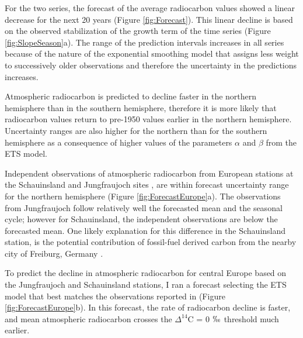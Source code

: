 \documentclass[a4paper, 11pt]{article}
\begin{document}
For the two series, the forecast of the average radiocarbon values showed a linear decrease for the next 20 years (Figure \ref{fig:Forecast}). This linear decline is based on the observed stabilization of the growth term of the time series (Figure \ref{fig:SlopeSeason}a). The range of the prediction intervals increases in all series because of the nature of the exponential smoothing model that assigns less weight to successively older observations and therefore the uncertainty in the predictions increases. 

Atmospheric radiocarbon is predicted to decline faster in the northern hemisphere than in the southern hemisphere, therefore it is more likely that radiocarbon values return to pre-1950 values earlier in the northern hemisphere. Uncertainty ranges are also higher for the northern than for the southern hemisphere as a consequence of higher values of the parameters $\alpha$ and $\beta$ from the ETS model.

Independent observations of atmospheric radiocarbon from European stations at the Schauinsland and Jungfraujoch sites \citep{Levin2013Tellus}, are within forecast uncertainty range for the northern hemisphere (Figure \ref{fig:ForecastEurope}a). The observations from Jungfraujoch follow relatively well the forecasted mean and the seasonal cycle; however for Schauinsland, the independent observations are below the forecasted mean. 
One likely explanation for this difference in the Schauinsland station, is the potential contribution of fossil-fuel derived carbon from the nearby city of Freiburg, Germany \citep{Levin1989Radiocarbon, Turnbull2009JGR, Levin2013Tellus}.


To predict the decline in atmospheric radiocarbon for central Europe based on the Jungfraujoch and Schauinsland stations, I ran a forecast selecting the ETS model that best matches the observations reported in \citet{Levin2013Tellus} (Figure \ref{fig:ForecastEurope}b). In this forecast, the rate of radiocarbon decline is faster, and mean atmospheric radiocarbon crosses the $\Delta^{14}$C = 0 $\permil$ threshold much earlier.
\end{document}
